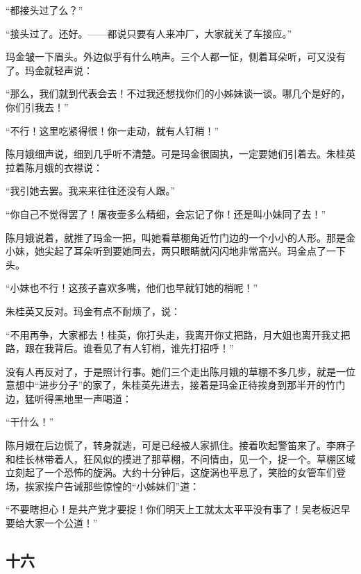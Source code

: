 \par “都接头过了么？”
\par “接头过了。还好。——都说只要有人来冲厂，大家就关了车接应。”
\par 玛金皱一下眉头。外边似乎有什么响声。三个人都一怔，侧着耳朵听，可又没有了。玛金就轻声说：
\par “那么，我们就到代表会去！不过我还想找你们的小姊妹谈一谈。哪几个是好的，你们引我去！”
\par “不行！这里吃紧得很！你一走动，就有人钉梢！”
\par 陈月娥细声说，细到几乎听不清楚。可是玛金很固执，一定要她们引着去。朱桂英拉着陈月娥的衣襟说：
\par “我引她去罢。我来来往往还没有人跟。”
\par “你自己不觉得罢了！屠夜壶多么精细，会忘记了你！还是叫小妹同了去！”
\par 陈月娥说着，就推了玛金一把，叫她看草棚角近竹门边的一个小小的人形。那是金小妹，她尖起了耳朵听到要她同去，两只眼睛就闪闪地非常高兴。玛金点了一下头。
\par “小妹也不行！这孩子喜欢多嘴，他们也早就钉她的梢呢！”
\par 朱桂英又反对。玛金有点不耐烦了，说：
\par “不用再争，大家都去！桂英，你打头走，我离开你丈把路，月大姐也离开我丈把路，跟在我背后。谁看见了有人钉梢，谁先打招呼！”
\par 没有人再反对了，于是照计行事。她们三个走出陈月娥的草棚不多几步，就是一位意想中“进步分子”的家了，朱桂英先进去，接着是玛金正待挨身到那半开的竹门边，猛听得黑地里一声喝道：
\par “干什么！”
\par 陈月娥在后边慌了，转身就逃，可是已经被人家抓住。接着吹起警笛来了。李麻子和桂长林带着人，狂风似的摸进了那草棚，不问情由，见一个，捉一个。草棚区域立刻起了一个恐怖的旋涡。大约十分钟后，这旋涡也平息了，笑脸的女管车们登场，挨家挨户告诫那些惊惶的“小姊妹们”道：
\par “不要瞎担心！是共产党才要捉！你们明天上工就太太平平没有事了！吴老板迟早要给大家一个公道！”



\subsection*{十六}


